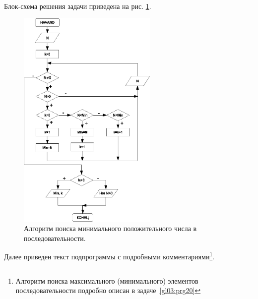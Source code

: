 

Блок-схема решения задачи приведена на рис. \ref{ch03:refDrawing34}.
\begin{figure}[htb]
\begin{center}
\includegraphics[width=0.6\textwidth]{img/ris_3_35}
\caption{Алгоритм поиска минимального положительного числа в последовательности.}
\label{ch03:refDrawing34}
\end{center}
\end{figure}

Далее приведен текст подпрограммы с подробными комментариями\footnote{Алгоритм поиска максимального (минимального)
элементов последовательности подробно описан в задаче~\ref{gl03:prg20}}.

